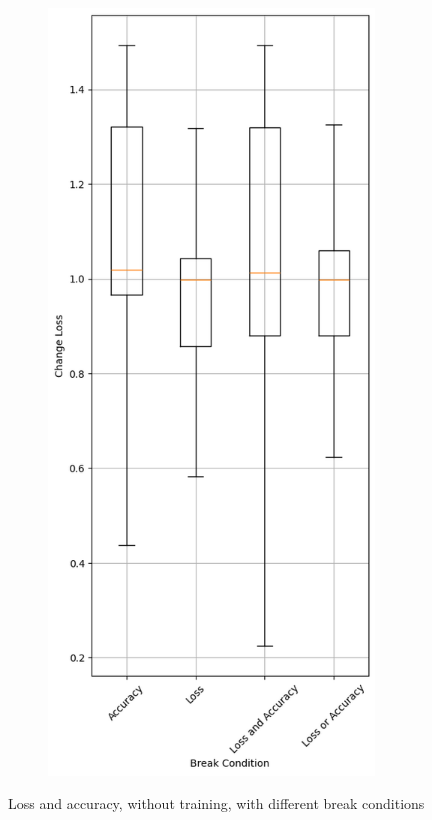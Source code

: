 \begin{figure}
\begin{subfigure}{0.5\textwidth}
    \end{subfigure}
    \begin{subfigure}{0.5\textwidth}
        \centering
        \includegraphics[width=0.95\textwidth]{plots/BreakCondition_NotTrained_loss.png}
    \end{subfigure}
    \caption{Loss and accuracy, without training, with different break conditions}
    \label{fig:break-conditions-notraining}
\end{figure}
